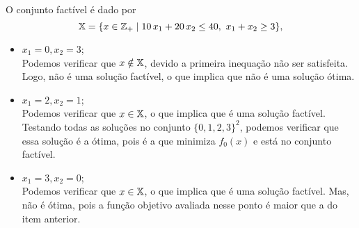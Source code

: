 \begin{questions}
\begin{solution}
	O conjunto factível é dado por
    \[{\mathbb X} = \{ x\in{\mathbb Z}_+ \mid 10\,x_1+20\,x_2\le 40,~ x_1+x_2\ge 3 \},\]
\begin{itemize}
\item $x_1 = 0, x_2 = 3$;\\
	Podemos verificar que $x\notin{\mathbb X}$, devido a primeira inequação não ser satisfeita. Logo, não é uma solução factível, o que implica que não é uma solução ótima.
\item $x_1 = 2, x_2 = 1$;\\
	Podemos verificar que $x\in{\mathbb X}$, o que implica que é uma solução factível. Testando todas as soluções no conjunto $\{0,1,2,3\}^2$, podemos verificar que essa solução é a ótima, pois é a que minimiza $f_0(x)$ e está no conjunto factível.
\item $x_1 = 3, x_2 = 0$;\\
	Podemos verificar que $x\in{\mathbb X}$, o que implica que é uma solução factível.  Mas, não é ótima, pois a função objetivo avaliada nesse ponto é maior que a do item anterior.
\end{itemize}
\end{solution}


\end{questions}
